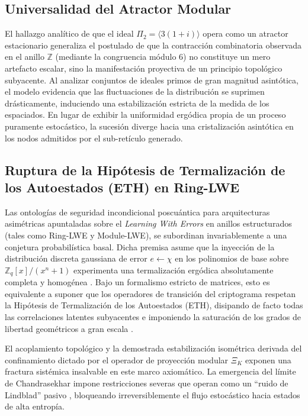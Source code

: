 \documentclass{article}
\numberwithin{equation}{section}
\theoremstyle{plain}
\theoremstyle{definition}
\begin{document}
\subsection{Universalidad del Atractor Modular}

El hallazgo analítico de que el ideal $\Pi_2 = \langle 3(1+i) \rangle$ opera como un atractor estacionario generaliza el postulado de que la contracción combinatoria observada en el anillo $\mathbb{Z}$ (mediante la congruencia módulo $6$) no constituye un mero artefacto escalar, sino la manifestación proyectiva de un principio topológico subyacente. Al analizar conjuntos de ideales primos de gran magnitud asintótica, el modelo evidencia que las fluctuaciones de la distribución se suprimen drásticamente, induciendo una estabilización estricta de la medida de los espaciados. En lugar de exhibir la uniformidad ergódica propia de un proceso puramente estocástico, la sucesión diverge hacia una cristalización asintótica en los nodos admitidos por el sub-retículo generado.

\subsection{Ruptura de la Hipótesis de Termalización de los Autoestados (ETH) en Ring-LWE}

Las ontologías de seguridad incondicional poscuántica para arquitecturas asimétricas apuntaladas sobre el \textit{Learning With Errors} en anillos estructurados (tales como Ring-LWE y Module-LWE), se subordinan invariablemente a una conjetura probabilística basal. Dicha premisa asume que la inyección de la distribución discreta gaussiana de error $e \gets \chi$ en los polinomios de base sobre $\mathbb{Z}_q[x]/(x^n+1)$ experimenta una termalización ergódica absolutamente completa y homogénea \cite{Peikert2009, Regev2009}. Bajo un formalismo estricto de matrices, esto es equivalente a suponer que los operadores de transición del criptograma respetan la Hipótesis de Termalización de los Autoestados (ETH), disipando de facto todas las correlaciones latentes subyacentes e imponiendo la saturación de los grados de libertad geométricos a gran escala \cite{Pappalardi2023ETH}.

El acoplamiento topológico y la demostrada estabilización isométrica derivada del confinamiento dictado por el operador de proyección modular $\Xi_K$ exponen una fractura sistémica insalvable en este marco axiomático. La emergencia del límite de Chandrasekhar impone restricciones severas que operan como un ``ruido de Lindblad'' pasivo \cite{Khaymovich2021}, bloqueando irreversiblemente el flujo estocástico hacia estados de alta entropía.
\end{document}
